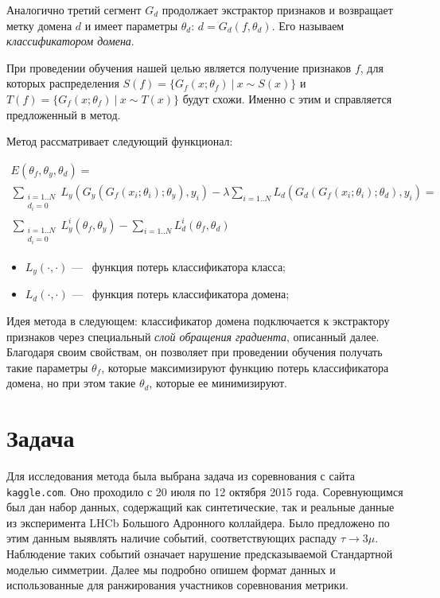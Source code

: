 \documentclass[14pt]{extarticle}
\begin{document}
Аналогично третий сегмент $G_d$ продолжает экстрактор признаков и возвращает метку домена $d$ и имеет параметры $\theta_d$: $d = G_d(f, \theta_d)$. Его называем \textit{классификатором домена}.
 
При проведении обучения нашей целью является получение признаков $f$, для которых распределения $S(f) = \{G_f(x; \theta_f)~|~x \sim S(x) \}$ и $T(f) = \{G_f(x; \theta_f)~|~x \sim T(x) \}$ будут схожи. Именно с этим и справляется предложенный в \cite{ganin} метод.

Метод рассматривает следующий функционал:

\begin{equation}\label{E}
\begin{gathered}
E(\theta_f, \theta_y, \theta_d) = \\ \sum_{ \substack{i=1..N \\ d_i=0} }L_y(G_y(G_f(x_i; \theta_i); \theta_y), y_i) - \lambda \sum_{ i=1..N } L_d(G_d(G_f(x_i; \theta_i); \theta_d), y_i) = \\\sum_{ \substack{i=1..N \\ d_i=0} } L_y^i(\theta_f, \theta_y) - \sum_{ i=1..N }  L_d^i(\theta_f, \theta_d)
\end{gathered}
\end{equation}
\begin{itemize}
\item $L_y(·, ·)$ —~ функция потерь классификатора класса;
\item $L_d(·, ·)$ —~ функция потерь классификатора домена;
\end{itemize}

Идея метода в следующем: классификатор домена подключается к экстрактору признаков через специальный \textit{слой обращения градиента}, описанный далее. Благодаря своим свойствам, он позволяет при проведении обучения получать такие параметры $\theta_f$, которые максимизируют функцию потерь классификатора домена, но при этом такие $\theta_d$, которые ее минимизируют.


\newpage
\section{Задача}

Для исследования метода была выбрана задача из соревнования \cite{kaggle_contest} с сайта \texttt{kaggle.com}. Оно проходило с 20 июля по 12 октября 2015 года. Соревнующимся был дан набор данных, содержащий как синтетические, так и реальные данные из эксперимента LHCb Большого Адронного коллайдера. Было предложено по этим данным выявлять наличие событий, соответствующих распаду $\tau \rightarrow 3\mu$. Наблюдение таких событий означает нарушение предсказываемой Стандартной моделью симметрии.
Далее мы подробно опишем формат данных и использованные для ранжирования участников соревнования метрики.  
\end{document}
